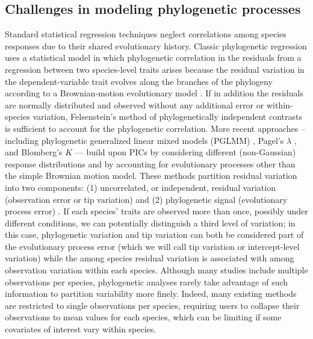 \documentclass[12pt]{article}
\begin{document}
\subsection*{Challenges in modeling phylogenetic processes}

Standard statistical regression techniques neglect correlations among species responses due to their shared evolutionary history.
Classic phylogenetic regression uses a statistical model in which phylogenetic correlation in the residuals from a regression between two species-level traits arises because the residual variation in the dependent-variable trait evolves along the branches of the phylogeny according to a Brownian-motion evolutionary model \citep{felsenstein1985phylogenies}. 
If in addition the residuals are normally distributed and observed without any additional error or within-species variation, Felsenstein's method of phylogenetically independent contrasts  \citep[PICS:][]{felsenstein1985phylogenies} is sufficient to account for the phylogenetic correlation.
More recent approaches -- including phylogenetic generalized linear mixed models (PGLMM) \citep{ives2011generalized, housworth2004phylogenetic}, Pagel's $\lambda$ \citep{pagel1999inferring}, and Blomberg's $K$ \citep{blomberg2003testing} --- build upon PICs by considering different (non-Gaussian) response distributions and by accounting for evolutionary processes other than the simple Brownian motion model. 
These methods partition residual variation into two components: (1) uncorrelated, or independent, residual variation (observation error or tip variation) and (2) phylogenetic signal (evolutionary process error) \citep{hansen2012interpreting, housworth2004phylogenetic}.
If each species' traits are observed more than once, possibly under different conditions, we can potentially distinguish a third level of variation; in this case, phylogenetic variation and tip variation can both be considered part of the evolutionary process error (which we will call tip variation or intercept-level variation) while the among species residual variation is associated with among observation variation within each species.
Although many studies include multiple observations per species, phylogenetic analyses rarely take advantage of such information to partition variability more finely.
Indeed, many existing methods are restricted to single observations per species, requiring users to collapse their observations to mean values for each species, which can be limiting if some covariates of interest vary within species.
\end{document}
